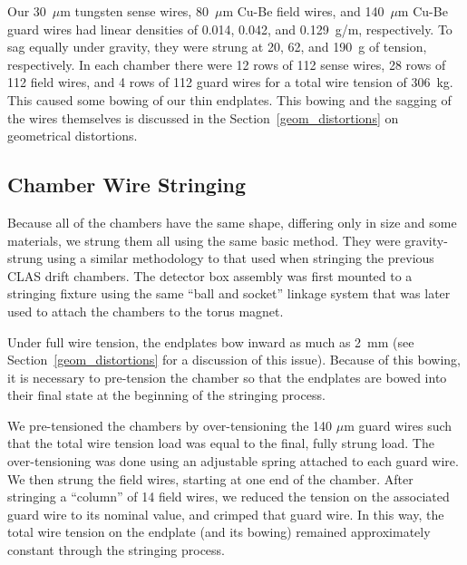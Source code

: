 Our 30~$\mu$m tungsten sense wires, 80~$\mu$m Cu-Be field wires, and 140~$\mu$m Cu-Be guard
wires had linear densities of 0.014, 0.042, and 0.129~g/m, respectively.  To sag equally
under gravity, they were strung at 20, 62, and 190~g of tension, respectively.
In each chamber there were 12 rows of 112 sense wires, 28 rows of 112 field wires,
and 4 rows of 112 guard wires for a total wire tension of 306~kg.
This caused some bowing of our thin endplates. This bowing and the sagging
of the wires themselves is discussed in the Section~\ref{geom_distortions} on geometrical distortions.

\subsection{Chamber Wire Stringing}
\label{stringing}


Because all of the chambers have the same shape, differing only in
size and some materials, we strung them all using the same basic method.
They were gravity-strung using a similar methodology to that 
used when stringing the previous CLAS drift chambers.  The detector box 
assembly was first mounted to a stringing fixture using the same
``ball and socket'' linkage system that was later used to attach the
chambers to the torus magnet.  


Under full wire tension, the endplates bow inward as much as 2~mm 
(see Section~\ref{geom_distortions} for a discussion of this issue).
Because of this bowing, it is necessary to pre-tension the chamber
so that the endplates are bowed into their final state at the 
beginning of the stringing process.

We pre-tensioned the chambers by over-tensioning the 140 $\mu$m guard
wires such that the total wire tension load was equal to the final, 
fully strung load.  The over-tensioning was done using an adjustable
spring attached to each guard wire. 
We then strung the field wires, starting at one end of the chamber.
After stringing a ``column'' of 14 field wires, we reduced the
tension on the associated guard wire to its nominal value, and crimped
that guard wire.  In this way, the total wire tension on the endplate
(and its bowing) remained approximately constant through the stringing process.

